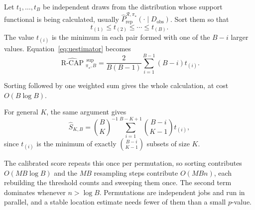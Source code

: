 \documentclass[11pt]{article}
\newcommand{\Regime}{\mathcal{R}}
\newcommand{\RCAPHatB}{\widehat{\operatorname{R\text{-}CAP}}{}^{\,\mathrm{sup}}_{\pi_\star,B}}
\newcommand{\PRepHat}{\widehat{P}_{\mathrm{rep}}^{\Regime,\pi_\star}}
\theoremstyle{remark}
\begin{document}
Let $t_1,\ldots,t_B$ be independent draws from the distribution whose support functional is being calculated, usually $\PRepHat(\cdot\mid D_{\mathrm{obs}})$. Sort them so that
\[
t_{(1)}\leq t_{(2)}\leq\cdots\leq t_{(B)}.
\]
The value $t_{(i)}$ is the minimum in each pair formed with one of the $B-i$ larger values. Equation~\eqref{eq:uestimator} becomes
\begin{equation}
\RCAPHatB
=
\frac{2}{B(B-1)}
\sum_{i=1}^{B-1}(B-i)t_{(i)}.
\label{eq:sorted}
\end{equation}

Sorting followed by one weighted sum gives the whole calculation, at cost $O(B\log B)$.

For general $K$, the same argument gives
\[
\widehat S_{K,B}
=
\binom{B}{K}^{-1}
\sum_{i=1}^{B-K+1}
\binom{B-i}{K-1}
t_{(i)},
\]
since $t_{(i)}$ is the minimum of exactly $\binom{B-i}{K-1}$ subsets of size $K$.

The calibrated score repeats this once per permutation, so sorting contributes $O(MB\log B)$ and the $MB$ resampling steps contribute $O(MBn)$, each rebuilding the threshold counts and sweeping them once. The second term dominates whenever $n>\log B$. Permutations are independent jobs and run in parallel, and a stable location estimate needs fewer of them than a small $p$-value.
\end{document}
